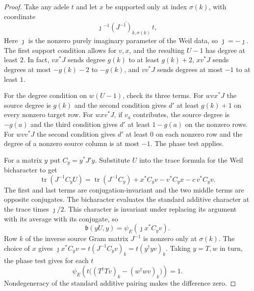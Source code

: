 \begin{proof}
Take any adele $t$ and let $x$ be supported only at index $\sigma(k)$, with coordinate
\[
  \overline{\jmath{}^{-1}(J^{-1})_{k,\sigma(k)}\,t},
\]
Here $\jmath{}$ is the nonzero purely imaginary parameter of the Weil data, so $\bar{\jmath{}}=-\jmath{}$. The first support condition allows  for $v,x$, and the resulting $U-1$ has degree at least $2$. In fact, $v x^\ast J$ sends degree $g(k)$ to at least $g(k)+2$, $x v^\ast J$ sends degrees at most $-g(k)-2$ to $-g(k)$, and $v v^\ast J$ sends degrees at most $-1$ to at least $1$.

For the degree condition on $w(U-1)$, check its three terms. For $wv x^\ast J$ the source degree is $g(k)$ and the second condition gives $d'$ at least $g(k)+1$ on every nonzero target row. For $wx v^\ast J$, if $v_a$ contributes, the source degree is $-g(a)$ and the third condition gives $d'$ at least $1-g(a)$ on the nonzero rows. For $wv v^\ast J$ the second condition gives $d'$ at least $0$ on each nonzero row and the degree of a nonzero source column is at most $-1$. The phase test applies.

For a matrix $y$ put $C_y=y^\ast J'y$. Substitute $U$ into the trace formula for the Weil bicharacter to get
\[
 \operatorname{tr}(J^{-1}C_yU)
 =\operatorname{tr}(J^{-1}C_y)
      +x^\ast C_yv-v^\ast C_yx-c\,v^\ast C_yv .
\]
The first and last terms are conjugation-invariant and the two middle terms are opposite conjugates. The bicharacter evaluates the standard additive character at the trace times $\jmath{}/2$. This character is invariant under replacing its argument with its average with its conjugate, so
\[
 \mathfrak b(yU,y)=\psi_E(\jmath{} x^\ast C_yv).
\]
Row $k$ of the inverse source Gram matrix $J^{-1}$ is nonzero only at $\sigma(k)$. The choice of $x$ gives $\jmath{} x^\ast C_yv=t(J^{-1}C_yv)_k=t(y^\dagger y v)_k$. Taking $y=T,w$ in turn, the phase test gives for each $t$
\[
  \psi_E\!\left(t\bigl((T^\dagger Tv)_k-(w^\dagger wv)_k\bigr)\right)=1 .
\]
Nondegeneracy of the standard additive pairing makes the difference zero.
\end{proof}


